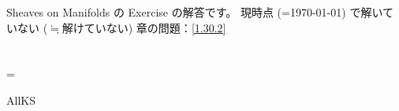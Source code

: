 \documentclass[uplatex,dvipdfmx]{jsarticle}
\begin{document}
\maketitle

Sheaves on Manifolds \cite[Chapter ]{kashiwara2002sheaves}の
Exercise の解答です。
現時点 (=\today) で解いていない (\(\fallingdotseq\)解けていない)
章の問題：\autoref{1.30.2}
\HeaderKS
\fi

\newpage
\section{}
\KSLoopChapCount=\value{section}


\ifcsname AllKS\endcsname\else
\printbibliography
\end{document}
